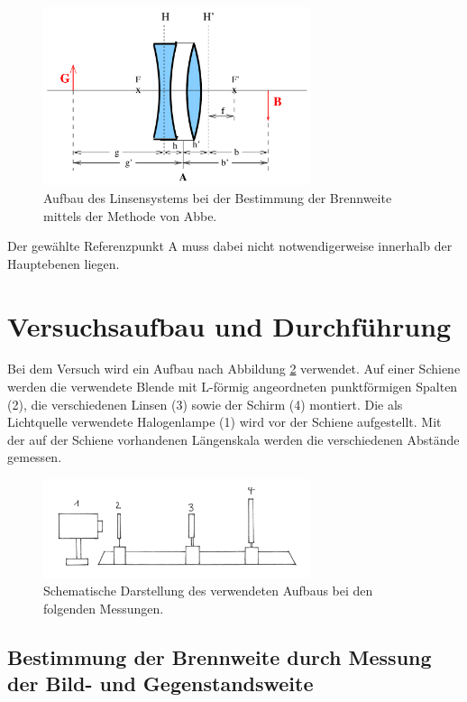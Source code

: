 \begin{figure}
  \centering
  \includegraphics[width = 0.7\textwidth]{Linsensystem.png}
  \caption{Aufbau des Linsensystems bei der Bestimmung der Brennweite mittels der
  Methode von Abbe.\cite{anleitung01}}
  \label{fig:Linsensystem}
\end{figure}

Der gewählte Referenzpunkt A muss dabei nicht notwendigerweise innerhalb der
Hauptebenen liegen.

\section{Versuchsaufbau und Durchführung}

Bei dem Versuch wird ein Aufbau nach Abbildung \ref{fig:Aufbau} verwendet. Auf einer
Schiene werden die verwendete Blende mit L-förmig angeordneten punktförmigen
Spalten (2), die verschiedenen Linsen (3) sowie der Schirm (4) montiert. Die als
Lichtquelle verwendete Halogenlampe (1) wird vor der Schiene aufgestellt.
Mit der auf der Schiene vorhandenen Längenskala werden die verschiedenen
Abstände gemessen.

\begin{figure}
  \centering
  \includegraphics[width = 0.7\textwidth]{Aufbau.JPG}
  \caption{Schematische Darstellung des verwendeten Aufbaus bei den folgenden Messungen. \cite{anleitung01}}
  \label{fig:Aufbau}
\end{figure}

\subsection{Bestimmung der Brennweite durch Messung der Bild- und Gegenstandsweite}

